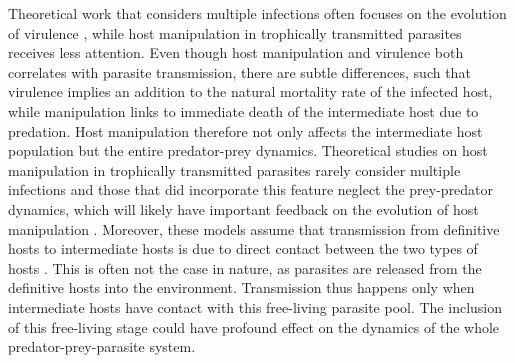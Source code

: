 \documentclass[a4paper]{scrartcl}
\begin{document}
Theoretical work that considers multiple infections often focuses on the evolution of virulence \citep{vanBaalen1995, Alizon2013, Alizon2008, Choisy2010, Alizon2012}, while host manipulation in trophically transmitted parasites receives less attention. 
\color{red} Even though host manipulation and virulence both correlates with parasite transmission, there are subtle differences, such that virulence implies an addition to the natural mortality rate of the infected host, while manipulation links to immediate death of the intermediate host due to predation. 
Host manipulation therefore not only affects the intermediate host population but the entire predator-prey dynamics. 
Theoretical studies on host manipulation in trophically transmitted parasites rarely consider multiple infections and those that did incorporate this feature neglect the prey-predator dynamics, which will likely have important feedback on the evolution of host manipulation \citep{Parker2003,Vickery2009}.
Moreover, these models assume that transmission from definitive hosts to intermediate hosts is due to direct contact between the two types of hosts \citep{Rogawa2018, Iritani2018, Hadeler1989, Fenton2006}. 
This is often not the case in nature, as parasites are released from the definitive hosts into the environment. Transmission thus happens only when intermediate hosts have contact with this free-living parasite pool. The inclusion of this free-living stage could have profound effect on the dynamics of the whole predator-prey-parasite system.
\end{document}
